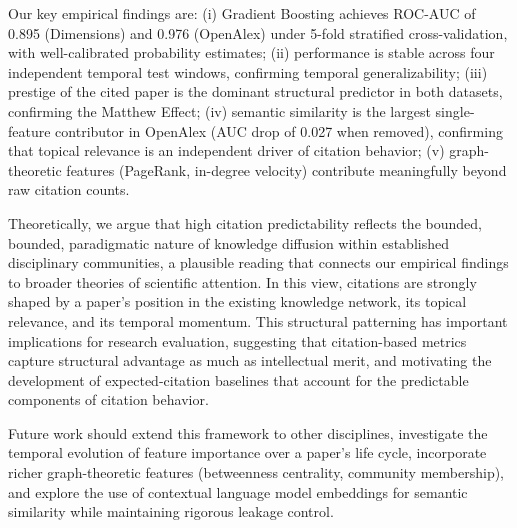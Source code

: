 \documentclass[12pt,a4paper]{article}
\begin{document}
Our key empirical findings are: (i) Gradient Boosting achieves ROC-AUC of 0.895
(Dimensions) and 0.976 (OpenAlex) under 5-fold stratified cross-validation, with
well-calibrated probability estimates; (ii) performance is stable across four
independent temporal test windows, confirming temporal generalizability; (iii)
prestige of the cited paper is the dominant structural predictor in both datasets,
confirming the Matthew Effect; (iv) semantic similarity is the largest single-feature
contributor in OpenAlex (AUC drop of 0.027 when removed), confirming that topical
relevance is an independent driver of citation behavior; (v) graph-theoretic features
(PageRank, in-degree velocity) contribute meaningfully beyond raw citation counts.

Theoretically, we argue that high citation predictability reflects the bounded,
bounded, paradigmatic nature of knowledge diffusion within established disciplinary
communities, a plausible reading that connects our empirical findings to broader
theories of scientific attention. In this view, citations are strongly shaped by a paper's position in the
existing knowledge network, its topical relevance, and its temporal momentum.
This structural patterning has important implications for research evaluation,
suggesting that citation-based metrics capture structural advantage as much as
intellectual merit, and motivating the development of expected-citation baselines
that account for the predictable components of citation behavior.

Future work should extend this framework to other disciplines, investigate the
temporal evolution of feature importance over a paper's life cycle, incorporate
richer graph-theoretic features (betweenness centrality, community membership),
and explore the use of contextual language model embeddings for semantic similarity
while maintaining rigorous leakage control.

\newpage


\end{document}
